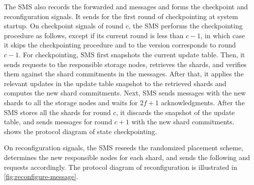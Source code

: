 The SMS also records the forwarded \votec and \voter messages and forms the checkpoint and reconfiguration signals.
It sends \votec for the first round of checkpointing at system startup.
On checkpoint signals of round $c$, the SMS performs the checkpointing procedure as follows, except if its current round is less than $c-1$, in which case it skips the checkpointing procedure and \forward to the version corresponds to round $c-1$.
For checkpointing, SMS first snapshots the current update table.
Then, it sends \retrieves requests to the responsible storage nodes, retrieves the shards, and verifies them against the shard commitments in the \votec messages.
After that, it applies the relevant updates in the update table snapshot to the retrieved shards and computes the new shard commitments.
Next, SMS sends \pushss messages with the new shards to all the storage nodes and waits for $2f+1$ acknowledgments.
After the SMS stores all the shards for round $c$, it discards the snapshot of the update table, and sends \votec messages for round $c+1$ with the new shard commitments.
 shows the protocol diagram of state checkpointing.

On reconfiguration signals, the SMS reseeds the randomized placement scheme, determines the new responsible nodes for each shard, and sends the following \retrieve and \retrieves requests accordingly.
The protocol diagram of reconfiguration is illustrated in \cref{fig:reconfigure-message}.
